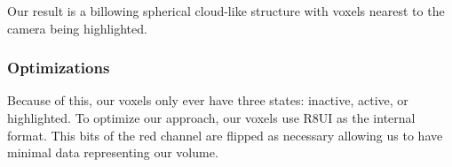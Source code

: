 Our result is a billowing spherical cloud-like structure with voxels nearest to the camera being highlighted. 


\subsubsection{Optimizations}
Because of this, our voxels only ever have three states: inactive, active, or highlighted. To optimize our approach, our voxels use R8UI as the internal format. This bits of the red channel are flipped as necessary allowing us to have minimal data representing our volume.

